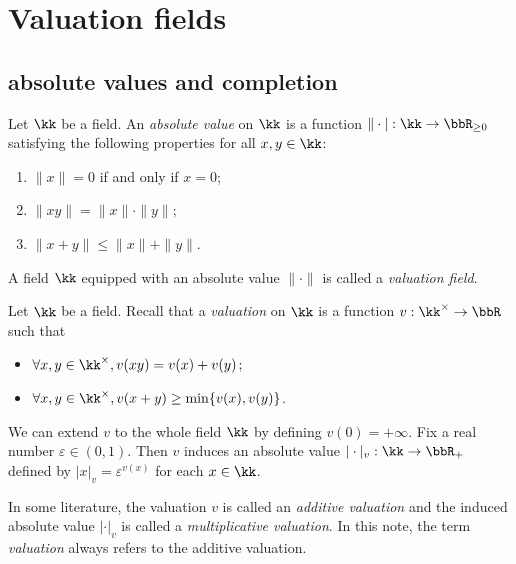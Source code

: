\section{Valuation fields}

\subsection{absolute values and completion}

    \begin{definition}\label{def:valuation_field}
        Let \(\kk\) be a field.
        An \emph{absolute value} on \(\kk\) is a function \(\|\cdot|:\kk\to\bbR_{\ge0}\) satisfying the following properties for all \(x,y\in\kk\):
        \begin{enumerate}
            \item \(\|x\|=0\) if and only if \(x=0\);
            \item \(\|xy\|=\|x\|\cdot\|y\|\);
            \item \(\|x+y\|\leq\|x\|+\|y\|\).
        \end{enumerate}
        A field \(\kk\) equipped with an absolute value \(\|\cdot\|\) is called a \emph{valuation field}.
    \end{definition}

    \begin{remark}\label{rmk:additive_and_multiplicative_valuation_on_a_field}
        Let \(\kk\) be a field.
        Recall that a \emph{valuation} on \(\kk\) is a function \(v: \kk^\times \to \bbR\) such that
        \begin{itemize}
            \item \(\forall x,y \in \kk^\times, v(xy) = v(x) + v(y)\);
            \item \(\forall x,y \in \kk^\times, v(x + y) \geq \min\{v(x), v(y)\}\).
        \end{itemize}
        We can extend \(v\) to the whole field \(\kk\) by defining \(v(0) = +\infty\).
        Fix a real number \(\varepsilon \in (0,1)\).
        Then \(v\) induces an absolute value \(|\cdot|_v: \kk \to \bbR_+\) defined by \(|x|_v = \varepsilon^{v(x)}\) for each \(x \in \kk\).

        In some literature, the valuation \(v\) is called an \emph{additive valuation} and the induced absolute value \(|\cdot|_v\) is called a \emph{multiplicative valuation}.
        In this note, the term \emph{valuation} always refers to the additive valuation.
    \end{remark}

